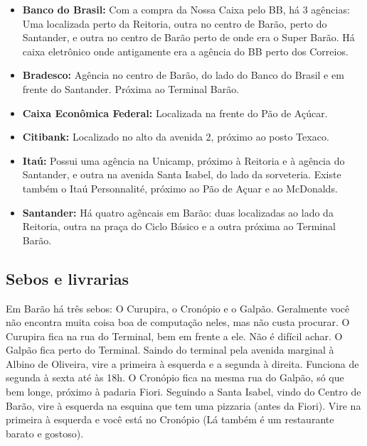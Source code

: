 \begin{itemize}
\item  \textbf{Banco do Brasil:} Com a compra da Nossa Caixa pelo BB, há 3 agências: Uma localizada perto da Reitoria, outra no centro de Barão, perto do Santander, e outra no centro de Barão perto de onde era o Super Barão. Há caixa eletrônico onde antigamente era a agência do BB perto dos Correios.
\end{itemize}

\begin{itemize}
\item  \textbf{Bradesco:} Agência no centro de Barão, do lado do Banco do Brasil e em frente do Santander. Próxima ao Terminal Barão.
\end{itemize}

\begin{itemize}
\item  \textbf{Caixa Econômica Federal:} Localizada na frente do Pão de Açúcar.
\end{itemize}

\begin{itemize}
\item  \textbf{Citibank:} Localizado no alto da avenida 2, próximo ao posto Texaco.
\end{itemize}

\begin{itemize}
\item  \textbf{Itaú:} Possui uma agência na Unicamp, próximo à Reitoria e à agência do Santander, e outra na avenida Santa Isabel, do lado da sorveteria. Existe também o Itaú Personnalité, próximo ao Pão de Açuar e ao McDonalds.
\end{itemize}

\begin{itemize}
\item  \textbf{Santander:} Há quatro agêncais em Barão: duas localizadas ao lado da Reitoria, outra na praça do Ciclo Básico e a outra próxima ao Terminal Barão.
\end{itemize}

\subsection{Sebos e livrarias}

Em Barão há três sebos: O Curupira, o Cronópio e o Galpão. Geralmente você não
encontra muita coisa boa de computação neles, mas não custa procurar. O Curupira
fica na rua do Terminal, bem em frente a ele. Não é difícil achar. O Galpão fica
perto do Terminal. Saindo do terminal pela avenida marginal à Albino de
Oliveira, vire a primeira à esquerda e a segunda à direita. Funciona de segunda
à sexta até às 18h. O Cronópio fica na mesma rua do Galpão, só que bem longe,
próximo à padaria Fiori. Seguindo a Santa Isabel, vindo do Centro de Barão, vire
à esquerda na esquina que tem uma pizzaria (antes da Fiori). Vire na primeira
à esquerda e você está no Cronópio (Lá também é um restaurante barato
e gostoso).

